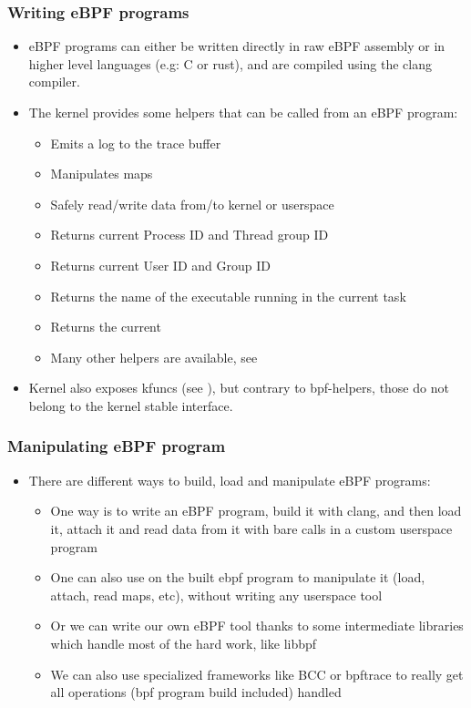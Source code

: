 \begin{frame}[fragile]
  \frametitle{Writing eBPF programs}
  \begin{itemize}
    \item eBPF programs can either be written directly in raw eBPF assembly or in
    higher level languages (e.g: C or rust), and are compiled using the clang
    compiler.
    \item The kernel provides some helpers that can be called from an eBPF program:
    \begin{itemize}
      \item {} Emits a log to the trace buffer
      \item {} Manipulates maps
      \item {} Safely read/write data from/to kernel or userspace
      \item {} Returns current Process ID and Thread group ID
      \item {} Returns current User ID and Group ID
      \item {} Returns the name of the executable running in the
      current task
      \item {} Returns the current 
      \item Many other helpers are available, see 
    \end{itemize}
    \item Kernel also exposes kfuncs (see ), but contrary
    to bpf-helpers, those do not belong to the kernel stable interface.
  \end{itemize}
\end{frame}

\begin{frame}[fragile]
  \frametitle{Manipulating eBPF program}
  \begin{itemize}
    \item There are different ways to build, load and manipulate eBPF programs:
    \begin{itemize}
      \item One way is to write an eBPF program, build it with clang, and then load it,
      attach it and read data from it with bare  calls in a custom
      userspace program
      \item One can also use  on the built ebpf program to
      manipulate it (load, attach, read maps, etc), without writing any userspace tool
      \item Or we can write our own eBPF tool thanks to some intermediate libraries which handle most of the
      hard work, like libbpf
      \item We can also use specialized frameworks like BCC or bpftrace to really
      get all operations (bpf program build included) handled
    \end{itemize}
  \end{itemize}
\end{frame}

